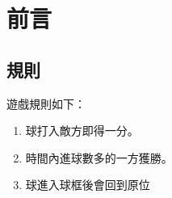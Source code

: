 \chapter{前言}
\renewcommand{\baselinestretch}{10.0} %
\setcounter{page}{1}  %
\fontsize{14pt}{2.5pt}\sectionef
\section{規則}
遊戲規則如下：
\begin{enumerate}
\item 球打入敵方即得一分。
\item 時間內進球數多的一方獲勝。
\item 球進入球框後會回到原位
\end{enumerate}
\renewcommand{\baselinestretch}{0.5} %